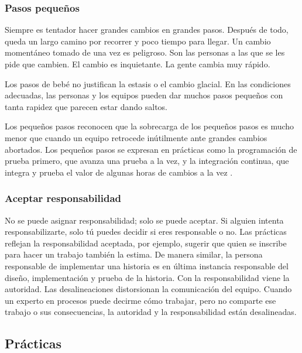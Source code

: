 \begin{spacing}{1.5}
		\subsubsection{Pasos pequeños}
			Siempre es tentador hacer grandes cambios en grandes pasos. Después de todo, queda un largo camino por recorrer y poco tiempo para llegar. Un cambio momentáneo tomado de una vez es peligroso. Son las personas a las que se les pide que cambien. El cambio es inquietante. La gente cambia muy rápido.
			
			 Los pasos de bebé no justifican la estasis o el cambio glacial. En las condiciones adecuadas, las personas y los equipos pueden dar muchos pasos pequeños con tanta rapidez que parecen estar dando saltos.
			
			Los pequeños pasos reconocen que la sobrecarga de los pequeños pasos es mucho menor que cuando un equipo retrocede inútilmente ante grandes cambios abortados. Los pequeños pasos se expresan en prácticas como la programación de prueba primero, que avanza una prueba a la vez, y la integración continua, que integra y prueba el valor de algunas horas de cambios a la vez \cite{chap2_extreme_programming}.
		\subsubsection{Aceptar responsabilidad}
			No se puede asignar responsabilidad; solo se puede aceptar. Si alguien intenta responsabilizarte, solo tú puedes decidir si eres responsable o no. Las prácticas reflejan la responsabilidad aceptada, por ejemplo, sugerir que quien se inscribe para hacer un trabajo también la estima. De manera similar, la persona responsable de implementar una historia es en última instancia responsable del diseño, implementación y prueba de la historia. Con la responsabilidad viene la autoridad. Las desalineaciones distorsionan la comunicación del equipo. Cuando un experto en procesos puede decirme cómo trabajar, pero no comparte ese trabajo o sus consecuencias, la autoridad y la responsabilidad están desalineadas.
	\subsection{Pr\'{a}cticas}

\end{spacing}
